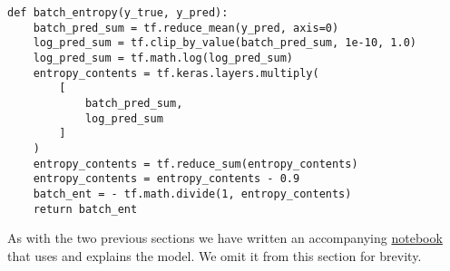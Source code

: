 \begin{minipage}{\linewidth}
\begin{lstlisting}[language=iPython]
def batch_entropy(y_true, y_pred):
    batch_pred_sum = tf.reduce_mean(y_pred, axis=0)
    log_pred_sum = tf.clip_by_value(batch_pred_sum, 1e-10, 1.0)
    log_pred_sum = tf.math.log(log_pred_sum)
    entropy_contents = tf.keras.layers.multiply(
        [
            batch_pred_sum,
            log_pred_sum
        ]
    )
    entropy_contents = tf.reduce_sum(entropy_contents)
    entropy_contents = entropy_contents - 0.9 
    batch_ent = - tf.math.divide(1, entropy_contents)
    return batch_ent
\end{lstlisting}
\end{minipage}

\noindent As with the two previous sections we have written an accompanying \href{https://github.com/ATTPC/VAE-event-classification/blob/master/notebooks/mixae_tutorial.ipynb}{notebook} that uses and explains the model. We omit it from this section for brevity.